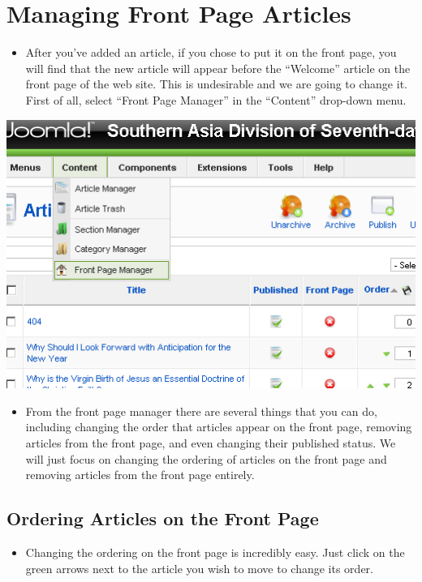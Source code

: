\documentclass[letterpaper,10pt,english]{manual}
\begin{document}
\section{Managing Front Page Articles}
\begin{itemize}
\item {} 
After you've added an article, if you chose to put it on the front page, you will find that the new article will appear before the “Welcome” article on the front page of the web site.  This is undesirable and we are going to change it.  First of all, select “Front Page Manager” in the “Content” drop-down menu.

\end{itemize}

{\hfill\includegraphics{articleFrontPageLink1.png}\hfill}
\begin{itemize}
\item {} 
From the front page manager there are several things that you can do, including changing the order that articles appear on the front page, removing articles from the front page, and even changing their published status.  We will just focus on changing the ordering of articles on the front page and removing articles from the front page entirely.

\end{itemize}

\hypertarget{index-53}{}\subsection{Ordering Articles on the Front Page}
\begin{itemize}
\item {} 
Changing the ordering on the front page is incredibly easy.  Just click on the green arrows next to the article you wish to move to change its order.

\end{itemize}
\end{document}
